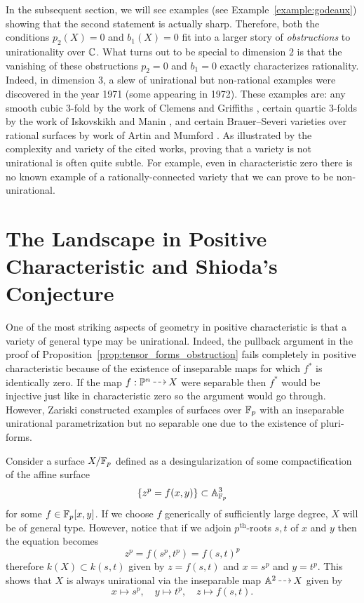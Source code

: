 \documentclass[main.tex]{subfiles}
\begin{document}
In the subsequent section, we will see examples (see Example~\ref{example:godeaux}) showing that the second statement is actually sharp. Therefore, both the conditions $p_2(X) = 0$ and $b_1(X) = 0$ fit into a larger story of \textit{obstructions} to unirationality over $\mathbb{C}$. What turns out to be special to dimension $2$ is that the vanishing of these obstructions $p_2 = 0$ and $b_1 = 0$ exactly characterizes rationality. Indeed, in dimension $3$, a slew of unirational but non-rational examples
were discovered in the year 1971 (some appearing in 1972). These examples are: any smooth cubic $3$-fold by the work of Clemens and Griffiths \cite{CG72}, certain quartic $3$-folds by the work of Iskovskikh and Manin \cite{IM71}, and certain Brauer--Severi varieties over rational surfaces by work of Artin and Mumford \cite{AM72}. As illustrated by the complexity and variety of the cited works, proving that a variety is not unirational is often quite subtle. For example, even in characteristic zero there is no known example of a rationally-connected variety that we can prove to be non-unirational. 


\section{The Landscape in Positive Characteristic and Shioda's Conjecture}

One of the most striking aspects of geometry in positive characteristic is that a variety of general type may be unirational. Indeed, the pullback argument in the proof of Proposition~\ref{prop:tensor_forms_obstruction} fails completely in positive characteristic because of the existence of inseparable maps for which $f^*$ is identically zero. If the map $f : \P^n \rat X$ were separable then $f^*$ would be injective just like in characteristic zero so the argument would go through. However, Zariski constructed examples of surfaces over $\mathbb{F}_p$ with an inseparable unirational parametrization but no separable one due to the existence of pluri-forms. 

\begin{example}[Zariski] \cite[\S8]{zariski:surface_examples}
Consider a surface $X / \mathbb{F}_p$ defined as a desingularization of some compactification of the affine surface
\[ \{ z^p = f(x,y) \} \subset \mathbb{A}^3_{\mathbb{F}_p} \]
for some $f \in \mathbb{F}_p[x,y]$. If we choose $f$ generically of sufficiently large degree, $X$ will be of general type. However, notice that if we adjoin $p^{\text{th}}$-roots $s,t$ of $x$ and $y$ then the equation becomes
\[ z^p = f(s^p, t^p) = f(s,t)^p \]
therefore $k(X) \subset k(s,t)$ given by $z = f(s,t)$ and $x = s^p$ and $y = t^p$. This shows that $X$ is always unirational via the inseparable map $\A^2 \rat X$ given by 
\[ x \mapsto s^p, \quad y \mapsto t^p, \quad z \mapsto f(s,t). \]
\end{example}
\end{document}

